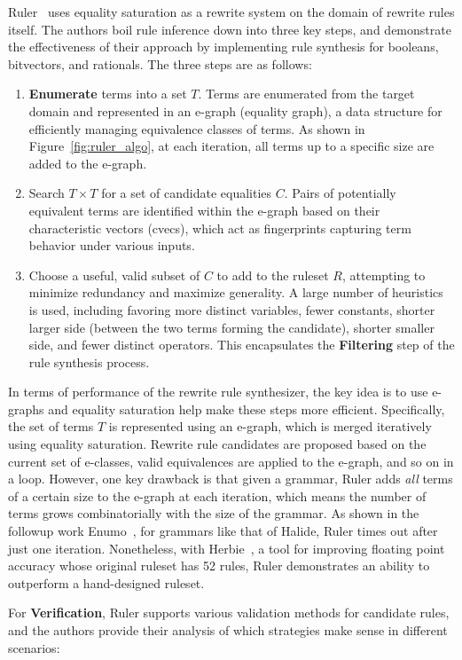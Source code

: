 \documentclass[acmsmall,screen,nonacm]{acmart}
\begin{document}
Ruler~\cite{nandi2021ruler} uses equality saturation as a rewrite system on the domain of rewrite rules itself. The authors boil rule inference down into three key steps, and demonstrate the effectiveness of their approach by implementing rule synthesis for booleans, bitvectors, and rationals. The three steps are as follows:
\begin{enumerate}
    \item \textbf{Enumerate} terms into a set $T$. Terms are enumerated from the target domain and represented in an e-graph (equality graph), a data structure for efficiently managing equivalence classes of terms. As shown in Figure~\ref{fig:ruler_algo}, at each iteration, all terms up to a specific size are added to the e-graph.
    \item Search $T \times T$ for a set of candidate equalities $C$. Pairs of potentially equivalent terms are identified within the e-graph based on their characteristic vectors (cvecs), which act as fingerprints capturing term behavior under various inputs.
    \item Choose a useful, valid subset of $C$ to add to the ruleset $R$, attempting to minimize redundancy and maximize generality. A large number of heuristics is used, including favoring more distinct variables, fewer constants, shorter larger side (between the two terms forming the candidate), shorter smaller side, and fewer distinct operators. This encapsulates the \textbf{Filtering} step of the rule synthesis process.
\end{enumerate}
In terms of performance of the rewrite rule synthesizer, the key idea is to use e-graphs and equality saturation help make these steps more efficient. Specifically, the set of terms $T$ is represented using an e-graph, which is merged iteratively using equality saturation. Rewrite rule candidates are proposed based on the current set of e-classes, valid equivalences are applied to the e-graph, and so on in a loop. However, one key drawback is that given a grammar, Ruler adds \emph{all} terms of a certain size to the e-graph at each iteration, which means the number of terms grows combinatorially with the size of the grammar. As shown in the followup work Enumo~\cite{pal2023enumo}, for grammars like that of Halide, Ruler times out after just one iteration. Nonetheless, with Herbie~\cite{panchekha2015herbie}, a tool for improving floating point accuracy whose original ruleset has 52 rules, Ruler demonstrates an ability to outperform a hand-designed ruleset.

For \textbf{Verification}, Ruler supports various validation methods for candidate rules, and the authors provide their analysis of which strategies make sense in different scenarios:
\end{document}
